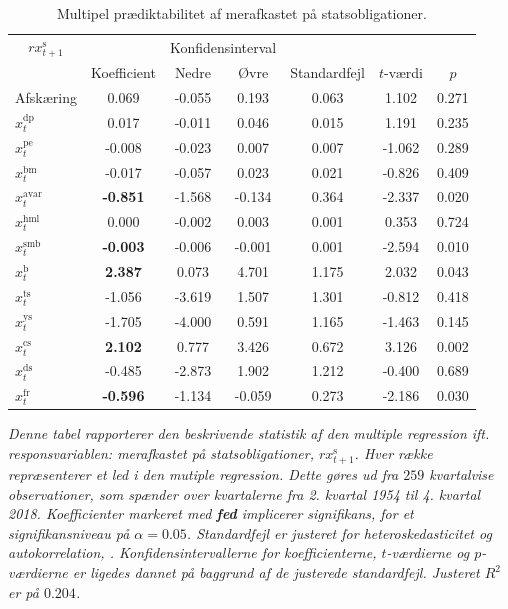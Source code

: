\documentclass[
  a4paper,
  oneside]{memoir}
\begin{document}
\begin{table}[H]

\caption{\label{tab:MULT-s}Multipel prædiktabilitet af merafkastet på statsobligationer.}
\centering
\begin{threeparttable}
\begin{tabular}[t]{lcccccc}
\toprule
\multicolumn{1}{c}{$rx_{t+1}^{\text{s}}$} & \multicolumn{1}{c}{ } & \multicolumn{2}{c}{Konfidensinterval} & \multicolumn{3}{c}{ } \\
\cmidrule(l{3pt}r{3pt}){1-1} \cmidrule(l{3pt}r{3pt}){3-4}
  & Koefficient & Nedre & Øvre & Standardfejl & $t$-værdi & $p$\\
\midrule
\rowcolor{gray!6}  Afskæring & 0.069 & -0.055 & 0.193 & 0.063 & 1.102 & 0.271\\
$x_t^{\text{dp}}$ & 0.017 & -0.011 & 0.046 & 0.015 & 1.191 & 0.235\\
\rowcolor{gray!6}  $x_t^{\text{pe}}$ & -0.008 & -0.023 & 0.007 & 0.007 & -1.062 & 0.289\\
$x_t^{\text{bm}}$ & -0.017 & -0.057 & 0.023 & 0.021 & -0.826 & 0.409\\
\rowcolor{gray!6}  $x_t^{\text{avar}}$ & \textbf{-0.851} & -1.568 & -0.134 & 0.364 & -2.337 & 0.020\\
$x_t^{\text{hml}}$ & 0.000 & -0.002 & 0.003 & 0.001 & 0.353 & 0.724\\
\rowcolor{gray!6}  $x_t^{\text{smb}}$ & \textbf{-0.003} & -0.006 & -0.001 & 0.001 & -2.594 & 0.010\\
$x_t^{\text{b}}$ & \textbf{ 2.387} & 0.073 & 4.701 & 1.175 & 2.032 & 0.043\\
\rowcolor{gray!6}  $x_t^{\text{ts}}$ & -1.056 & -3.619 & 1.507 & 1.301 & -0.812 & 0.418\\
$x_t^{\text{ys}}$ & -1.705 & -4.000 & 0.591 & 1.165 & -1.463 & 0.145\\
\rowcolor{gray!6}  $x_t^{\text{cs}}$ & \textbf{ 2.102} & 0.777 & 3.426 & 0.672 & 3.126 & 0.002\\
$x_t^{\text{ds}}$ & -0.485 & -2.873 & 1.902 & 1.212 & -0.400 & 0.689\\
\rowcolor{gray!6}  $x_t^{\text{fr}}$ & \textbf{-0.596} & -1.134 & -0.059 & 0.273 & -2.186 & 0.030\\
\bottomrule
\end{tabular}
\begin{tablenotes}
\item \textit{Denne tabel rapporterer den beskrivende statistik af den multiple regression ift. responsvariablen: merafkastet på statsobligationer, $rx_{t+1}^{\text{s}}$. Hver række repræsenterer et led i den mutiple regression. Dette gøres ud fra $259$ kvartalvise observationer, som spænder over kvartalerne fra 2. kvartal 1954 til 4. kvartal 2018. Koefficienter markeret med \textbf{fed} implicerer signifikans, for et signifikansniveau på $\alpha=0.05$. Standardfejl er justeret for heteroskedasticitet og autokorrelation, \citep{Newey1987}. Konfidensintervallerne for koefficienterne, $t$-værdierne og $p$-værdierne er ligedes dannet på baggrund af de justerede standardfejl. Justeret $R^2$ er på $0.204$.}
\end{tablenotes}
\end{threeparttable}
\end{table}
\end{document}
